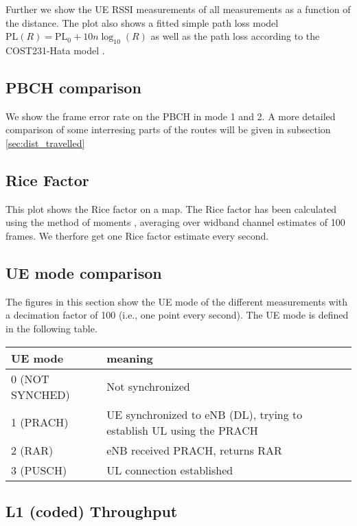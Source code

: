 \documentclass[a4paper,10pt]{article}
\begin{document}
Further we show the UE RSSI measurements of all measurements as a function of the distance. The plot also shows a fitted simple path loss model $\mathrm{PL}(R) = \mathrm{PL}_0 + 10n\log_{10}(R)$ as well as the path loss according to the COST231-Hata model \cite{cost231}.

\subsection{PBCH comparison}
We show the frame error rate on the PBCH in mode 1 and 2. A more detailed comparison of some interresing parts of the routes will be given in subsection \ref{sec:dist_travelled}

\subsection{Rice Factor}
This plot shows the Rice factor on a map. The Rice factor has been calculated using the method of moments \cite{Greenstein1999}, averaging over widband channel estimates of 100 frames. We therfore get one Rice factor estimate every second. 

\subsection{UE mode comparison}
The figures in this section show the UE mode of the different measurements with a decimation factor of 100 (i.e., one point every second). The UE mode is defined in the following table.

\begin{center}
\begin{tabular}{l|p{6cm}}
UE mode & meaning \\ 
\hline
0 (NOT SYNCHED) & Not synchronized \\ 
1 (PRACH) & UE synchronized to eNB (DL), trying to establish UL using the PRACH\\ 
2 (RAR) & eNB received PRACH, returns RAR \\ 
3 (PUSCH) & UL connection established
\end{tabular}
\end{center}


\subsection{L1 (coded) Throughput}
\end{document}
